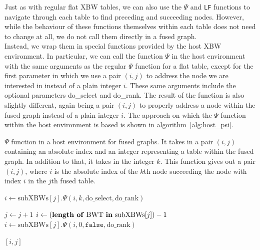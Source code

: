 \documentclass[a4paper,12pt,twoside,BCOR=10mm]{scrbook}
\begin{document}
Just as with regular flat XBW tables, we can also use the $ \Psi $ and \texttt{LF} functions
to navigate through each table to find preceding and succeeding nodes.
However, while the behaviour of these functions themselves within each table does not need to change
at all, we do not call them directly in a fused graph. \\
Instead, we wrap them in special functions provided by the host XBW environment.
In particular, we can call the function $\Psi$ in the host environment with the same arguments
as the regular $ \Psi $ function for a flat table, except for the first parameter
in which we use a pair $ (i, j) $ to address the node
we are interested in instead of a plain integer $ i $.
These same arguments include the optional parameters do\_select and do\_rank.
The result of the function is also slightly different, again being a pair $ (i, j) $ to
properly address a node within the fused graph instead of a plain integer $ i $.
The approach on which the $ \Psi $ function within the host environment is based
is shown in algorithm~\ref{alg:host_psi}. \\
\begin{algorithm}
\caption[$\Psi$ function in a host environment for fused graphs]{$\Psi$ function in a host environment for fused graphs. It takes in a pair $ (i, j) $ containing an absolute index and an integer representing a table within the fused graph. In addition to that, it takes in the integer $ k $. This function gives out a pair $ (i, j) $, where $ i $ is the absolute index of the $ k $th node succeeding the node with index $ i $ in the $ j $th fused table.}
\label{alg:host_psi}
\begin{algorithmic}[1]

\State $ i \gets \textrm{subXBWs}[ j ].{\Psi}( i, k, \textrm{do\_select}, \textrm{do\_rank} ) $

\State \phantom{nl}

	\State $ j \gets j + 1 $
	\State $ i \gets ( \textrm{\textbf{length of} BWT \textbf{in} subXBWs}[ j ] ) - 1 $
	\State $ i \gets \textrm{subXBWs}[ j ].{\Psi}( i, 0, \texttt{false}, \textrm{do\_rank} ) $
\EndIf

\State \phantom{nl}

\State \Return $ [ i, j ] $

\end{algorithmic}
\end{algorithm}
\end{document}
